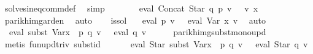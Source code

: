\begin{isabellebody}
\ solves{\isacharunderscore}{\kern0pt}ineq{\isacharunderscore}{\kern0pt}comm{\isacharunderscore}{\kern0pt}def\ \isamarkupfalse%
\ simp\isanewline
\ \ \isamarkupfalse%
\ \isamarkupfalse%
\ {}{\isacharcolon}{\kern0pt}\ {\isachardoublequoteopen}{\isasymPsi}\ {\isacharparenleft}{\kern0pt}eval\ {\isacharparenleft}{\kern0pt}Concat\ {\isacharparenleft}{\kern0pt}Star\ q{\isacharparenright}{\kern0pt}\ p{\isacharparenright}{\kern0pt}\ v{\isacharparenright}{\kern0pt}\ {\isasymsubseteq}\ {\isasymPsi}\ {\isacharparenleft}{\kern0pt}v\ x{\isacharparenright}{\kern0pt}{\isachardoublequoteclose}\isanewline
\ \ \ \ \isamarkupfalse%
\ parikh{\isacharunderscore}{\kern0pt}img{\isacharunderscore}{\kern0pt}arden\ \isamarkupfalse%
\ auto\isanewline
\ \ \isamarkupfalse%
\ is{\isacharunderscore}{\kern0pt}sol{\isacharprime}{\kern0pt}\ \isamarkupfalse%
\ {\isachardoublequoteopen}{\isasymPsi}\ {\isacharparenleft}{\kern0pt}eval\ p\ v{\isacharparenright}{\kern0pt}\ {\isasymsubseteq}\ {\isasymPsi}\ {\isacharparenleft}{\kern0pt}eval\ {\isacharparenleft}{\kern0pt}Var\ x{\isacharparenright}{\kern0pt}\ v{\isacharparenright}{\kern0pt}{\isachardoublequoteclose}\ \isamarkupfalse%
\ auto\isanewline
\ \ \isamarkupfalse%
\ \isamarkupfalse%
\ {\isachardoublequoteopen}{\isasymPsi}\ {\isacharparenleft}{\kern0pt}eval\ {\isacharparenleft}{\kern0pt}subst\ {\isacharparenleft}{\kern0pt}Var{\isacharparenleft}{\kern0pt}x\ {\isacharcolon}{\kern0pt}{\isacharequal}{\kern0pt}\ p{\isacharparenright}{\kern0pt}{\isacharparenright}{\kern0pt}\ q{\isacharparenright}{\kern0pt}\ v{\isacharparenright}{\kern0pt}\ {\isasymsubseteq}\ {\isasymPsi}\ {\isacharparenleft}{\kern0pt}eval\ q\ v{\isacharparenright}{\kern0pt}{\isachardoublequoteclose}\isanewline
\ \ \ \ \isamarkupfalse%
\ parikh{\isacharunderscore}{\kern0pt}img{\isacharunderscore}{\kern0pt}subst{\isacharunderscore}{\kern0pt}mono{\isacharunderscore}{\kern0pt}upd\ \isamarkupfalse%
\ {\isacharparenleft}{\kern0pt}metis\ fun{\isacharunderscore}{\kern0pt}upd{\isacharunderscore}{\kern0pt}triv\ subst{\isacharunderscore}{\kern0pt}id{\isacharparenright}{\kern0pt}\isanewline
\ \ \isamarkupfalse%
\ \isamarkupfalse%
\ {\isachardoublequoteopen}{\isasymPsi}\ {\isacharparenleft}{\kern0pt}eval\ {\isacharparenleft}{\kern0pt}Star\ {\isacharparenleft}{\kern0pt}subst\ {\isacharparenleft}{\kern0pt}Var{\isacharparenleft}{\kern0pt}x\ {\isacharcolon}{\kern0pt}{\isacharequal}{\kern0pt}\ p{\isacharparenright}{\kern0pt}{\isacharparenright}{\kern0pt}\ q{\isacharparenright}{\kern0pt}{\isacharparenright}{\kern0pt}\ v{\isacharparenright}{\kern0pt}\ {\isasymsubseteq}\ {\isasymPsi}\ {\isacharparenleft}{\kern0pt}eval\ {\isacharparenleft}{\kern0pt}Star\ q{\isacharparenright}{\kern0pt}\ v{\isacharparenright}{\kern0pt}{\isachardoublequoteclose}\isanewline

\end{isabellebody}
